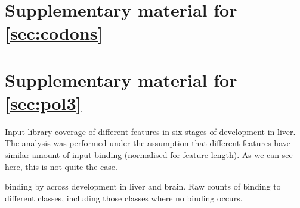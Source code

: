 \chapter{Supplementary material for \texorpdfstring{\cref*{sec:codons}}{chapter 3}}





\chapter{Supplementary material for \texorpdfstring{\cref*{sec:pol3}}{chapter 4}}

    {Input library coverage}
    {of different features in six stages of development in liver. The analysis was
    performed under the assumption that different features have similar amount
    of input binding (normalised for feature length). As we can see here, this
    is not quite the case.}

    { binding by  across development in liver and
    brain.}
    {Raw counts of  binding to different  classes,
    including those classes where no binding occurs.}

\endgroup
